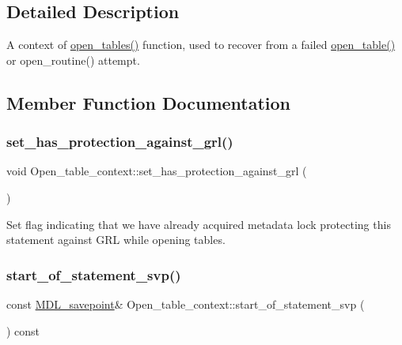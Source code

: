 \subsection{Detailed Description}
A context of \mbox{\hyperlink{group__Data__Dictionary_ga59e488af7a3f47be08fad22370de07c5}{open\+\_\+tables()}} function, used to recover from a failed \mbox{\hyperlink{group__Data__Dictionary_ga43cb5a9ba1064a36db89ad5c4d645528}{open\+\_\+table()}} or open\+\_\+routine() attempt. 

\subsection{Member Function Documentation}
\mbox{\label{classOpen__table__context_a50d842b440bbda463e5780b67fd7897a}} 
\subsubsection{\texorpdfstring{set\+\_\+has\+\_\+protection\+\_\+against\+\_\+grl()}{set\_has\_protection\_against\_grl()}}
{\footnotesize\ttfamily void Open\+\_\+table\+\_\+context\+::set\+\_\+has\+\_\+protection\+\_\+against\+\_\+grl (\begin{DoxyParamCaption}{ }\end{DoxyParamCaption})\hspace{0.3cm}{\ttfamily [inline]}}

Set flag indicating that we have already acquired metadata lock protecting this statement against G\+RL while opening tables. \mbox{\label{classOpen__table__context_afad4536802b51dd231dd4a4e91309abb}} 
\subsubsection{\texorpdfstring{start\+\_\+of\+\_\+statement\+\_\+svp()}{start\_of\_statement\_svp()}}
{\footnotesize\ttfamily const \mbox{\hyperlink{classMDL__savepoint}{M\+D\+L\+\_\+savepoint}}\& Open\+\_\+table\+\_\+context\+::start\+\_\+of\+\_\+statement\+\_\+svp (\begin{DoxyParamCaption}{ }\end{DoxyParamCaption}) const\hspace{0.3cm}{\ttfamily [inline]}}

